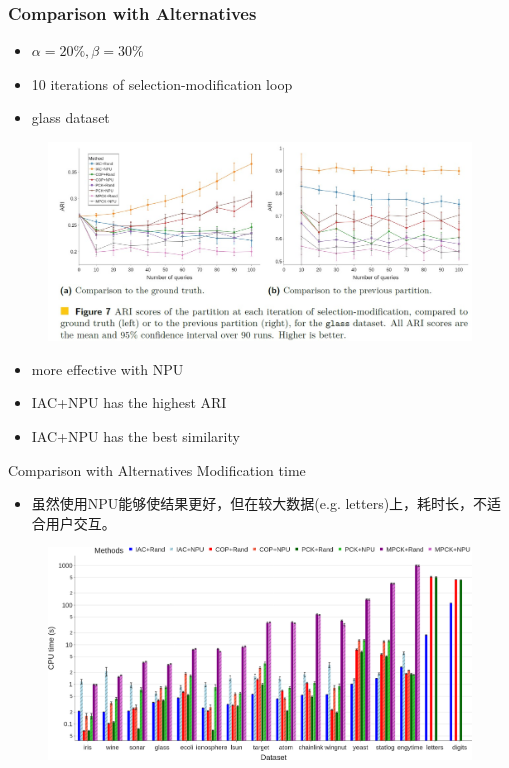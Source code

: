 \documentclass{beamer}
\begin{document}
\begin{frame}
    \frametitle{Comparison with Alternatives}
    \begin{itemize}
        \item $\alpha=20\%,\beta=30\%$
        \item 10 iterations of selection-modification loop
        \item glass dataset
    \end{itemize}
    
    \begin{figure}
        \centering
        \includegraphics[width=0.8\linewidth]{./images/comp.jpg}
    \end{figure}
    \begin{itemize}
        \item more effective with NPU 
        \item IAC+NPU has the highest ARI
        \item IAC+NPU has the best similarity
    \end{itemize}
    

\end{frame}
\begin{frame}{Comparison with Alternatives}
    Modification time
    \begin{itemize}
        \item 虽然使用NPU能够使结果更好，但在较大数据(e.g. letters)上，耗时长，不适合用户交互。
    \end{itemize}
    
    \begin{figure}
        \centering
        \includegraphics[width=0.8\linewidth]{./images/time.png}
    \end{figure}

    
\end{frame}
\end{document}

